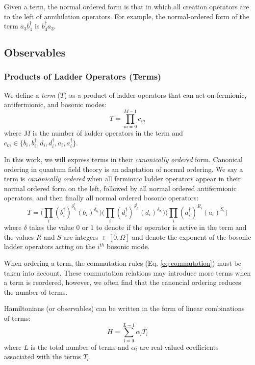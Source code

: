 Given a term, the normal ordered form is that in which all creation operators are to the left of annihilation operators.
For example, the normal-ordered form of the term $a_3 b_4^\dagger$ is $b_4^\dagger a_3$.

\subsection{Observables}
\label{subsec:observables}

\subsubsection{Products of Ladder Operators (Terms)}

We define a \textit{term} ($T$) as a product of ladder operators that can act on fermionic, antifermionic, and bosonic modes:
\begin{equation}
    \label{eq:term}
    T = \prod_{m=0}^{M-1} c_m
\end{equation}
where $M$ is the number of ladder operators in the term and $c_m \in \{b_i, b_i^\dagger, d_i, d_i^\dagger, a_i, a_i^\dagger\}$.


In this work, we will express terms in their \emph{canonically ordered} form.
Canonical ordering in quantum field theory is an adaptation of normal ordering.
We say a term is \textit{canonically ordered} when all fermionic ladder operators appear in their normal ordered form on the left, followed by all normal ordered antifermionic operators, and then finally all normal ordered bosonic operators:
\begin{equation}
    T = \Big( \prod_i (b_i^\dagger)^{\delta_{b_i}^{\dagger}} (b_i)^{\delta_{b_i}} \Big) \Big( \prod_i (d_i^\dagger)^{\delta_{d_i}^{\dagger}} (d_i)^{\delta_{d_i}} \Big)   \Big( \prod_i (a_i^\dagger)^{R_i}(a_i)^{S_i} \Big) 
\end{equation}
where $\delta$ takes the value $0$ or $1$ to denote if the operator is active in the term and the values $R$ and $S$ are integers $\in [0, \Omega]$ and denote the exponent of the bosonic ladder operators acting on the $i^{th}$ bosonic mode.

When ordering a term, the commutation rules (Eq. \ref{eq:commutation}) must be taken into account.
These commutation relations may introduce more terms when a term is reordered, however, we often find that the canoncial ordering reduces the number of terms.


Hamiltonians (or observables) can be written in the form of linear combinations of terms:
\begin{equation}
    \label{eq:lclo}
    H = \sum_{l=0}^{L-1} \alpha_l T_l
\end{equation}
where $L$ is the total number of terms and $\alpha_l$ are real-valued coefficients associated with the terms $T_l$.
